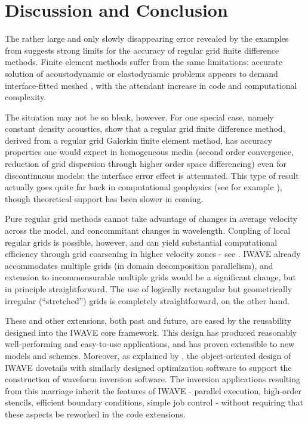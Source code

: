 \section{Discussion and Conclusion}
The rather large and only slowly disappearing error revealed by the
examples from \cite{SymesVdovina:09} suggests strong limits for the
accuracy of regular grid finite difference methods. Finite element
methods suffer from the same limitations: accurate solution of
acoustodynamic or elastodynamic problems appears to demand
interface-fitted meshed \cite[]{Cohen:01}, with the attendant increase
in code and computational complexity.

The situation may not be so bleak, however. For one special case,
namely constant density acoustics, 
\cite{Terentyev:09} show that a regular grid finite difference method,
derived from a regular grid Galerkin finite element method, has
accuracy properties one would expect in homogeneous media (second
order convergence, reduction of grid dispersion through higher order
space differencing) even for discontinuous models: the interface error
effect is attenuated. This type of result actually goes quite far back
in computational geophysics (see for example \cite{Muiretal:92}),
though theoretical support has been slower in coming.

Pure regular grid methods cannot take advantage of changes in average
velocity across the model, and concommitant changes in
wavelength. Coupling of local regular grids is possible, however, and
can yield substantial computational efficiency through grid coarsening
in higher velocity zones - see \cite{moczoetal:06}. IWAVE already
accommodates multiple grids (in domain decomposition parallelism), and
extension to incommensurable multiple grids would be a significant
change, but in principle
straightforward. The use of logically rectangular but
geometrically irregular (``stretched'') grids is completely
straightforward, on the other hand. 

These and other extensions, both past and future, are eased by the
reusability designed into the IWAVE core framework. This design has produced
reasonably well-performing and easy-to-use applications, and has proven
extensible to new models and schemes. Moreover, as explained by
\cite{GeoPros:11}, the object-oriented design of IWAVE dovetails with
similarly designed optimization software to support the construction
of waveform inversion software. The inversion applications resulting
from this marriage inherit the features of IWAVE - parallel execution,
high-order stencils, efficient boundary conditions, simple job control
- without requiring that these aspects be reworked in the code extensions. 

